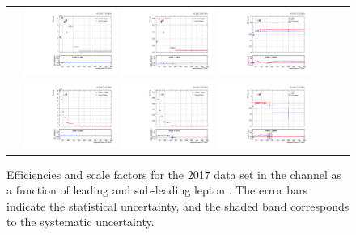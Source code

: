 \begin{figure}[htb]
  \begin{center}
    \begin{tabular}{ccc}
      \includegraphics[width=0.30\textwidth]{fig_2017_TrigSF/g_lepApt_mumu_MC.pdf}
      \includegraphics[width=0.30\textwidth]{fig_2017_TrigSF/g_lepApt_mumu_data.pdf}
      \includegraphics[width=0.30\textwidth]{fig_2017_TrigSF/g_mumu_lepApt_FullSystUncBand.pdf}\\
      \includegraphics[width=0.30\textwidth]{fig_2017_TrigSF/g_lepBpt_mumu_MC.pdf}
      \includegraphics[width=0.30\textwidth]{fig_2017_TrigSF/g_lepBpt_mumu_data.pdf}
      \includegraphics[width=0.30\textwidth]{fig_2017_TrigSF/g_mumu_lepBpt_FullSystUncBand.pdf}\\
    \end{tabular}
    \caption{Efficiencies and scale factors for the 2017 data set in the \mumu channel as a function of leading and sub-leading lepton \pT.
            The error bars indicate the statistical uncertainty, and the shaded band corresponds to the systematic uncertainty.
            }
    \label{TrigSF_2017_3}
  \end{center}
\end{figure}

